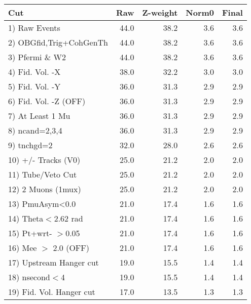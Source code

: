  \begin{table}[h!]\centering
 \begin{tabular}{||l||r|r|r|r||}
 \hline
 \hline
 Cut & Raw & Z-weight & Norm0 & Final \\
 \hline
  1) Raw Events           &        44.0 &        38.2 &         3.6 &         3.6 \\
  2) OBGfid,Trig+CohGenTh &        44.0 &        38.2 &         3.6 &         3.6 \\
  3) Pfermi \& W2         &        44.0 &        38.2 &         3.6 &         3.6 \\
  4) Fid. Vol. -X         &        38.0 &        32.2 &         3.0 &         3.0 \\
  5) Fid. Vol. -Y         &        36.0 &        31.3 &         2.9 &         2.9 \\
  6) Fid. Vol. -Z (OFF)   &        36.0 &        31.3 &         2.9 &         2.9 \\
  7) At Least 1 Mu        &        36.0 &        31.3 &         2.9 &         2.9 \\
  8) ncand=2,3,4          &        36.0 &        31.3 &         2.9 &         2.9 \\
  9) tnchgd=2             &        32.0 &        28.0 &         2.6 &         2.6 \\
 10) +/- Tracks (V0)      &        25.0 &        21.2 &         2.0 &         2.0 \\
 11) Tube/Veto Cut        &        25.0 &        21.2 &         2.0 &         2.0 \\
 12) 2 Muons (1mux)       &        25.0 &        21.2 &         2.0 &         2.0 \\
 13) PmuAsym<0.0          &        21.0 &        17.4 &         1.6 &         1.6 \\
 14) Theta$<$2.62 rad     &        21.0 &        17.4 &         1.6 &         1.6 \\
 15) Pt+wrt- $>$0.05      &        21.0 &        17.4 &         1.6 &         1.6 \\
 16) Mee $>$ 2.0  (OFF)   &        21.0 &        17.4 &         1.6 &         1.6 \\
 17) Upstream Hanger cut  &        19.0 &        15.5 &         1.4 &         1.4 \\
 18) nsecond$<$4          &        19.0 &        15.5 &         1.4 &         1.4 \\
 19) Fid. Vol. Hanger cut &        17.0 &        13.5 &         1.3 &         1.3 \\

\end{tabular}
\end{table}
